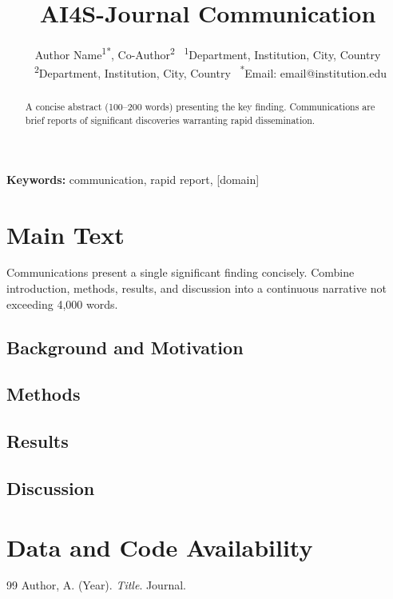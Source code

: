 \documentclass[12pt,a4paper]{article}
\title{\textbf{\textcolor{ai4sgold}{AI4S-Journal} Communication}}
\author{Author Name\textsuperscript{1*}, Co-Author\textsuperscript{2} \
\textsuperscript{1}Department, Institution, City, Country \
\textsuperscript{2}Department, Institution, City, Country \
\textsuperscript{*}Email: email@institution.edu}
\date{}
\begin{document}
\maketitle

\begin{abstract}
A concise abstract (100--200 words) presenting the key finding. Communications
are brief reports of significant discoveries warranting rapid dissemination.
\end{abstract}
\noindent\textbf{Keywords:} communication, rapid report, [domain]

\section{Main Text}
Communications present a single significant finding concisely. Combine
introduction, methods, results, and discussion into a continuous narrative
not exceeding 4,000 words.

\subsection{Background and Motivation}
\subsection{Methods}
\subsection{Results}
\subsection{Discussion}

\section*{Data and Code Availability}


\begin{thebibliography}{99}
 Author, A. (Year). \textit{Title}. Journal.
\end{thebibliography}
\end{document}

